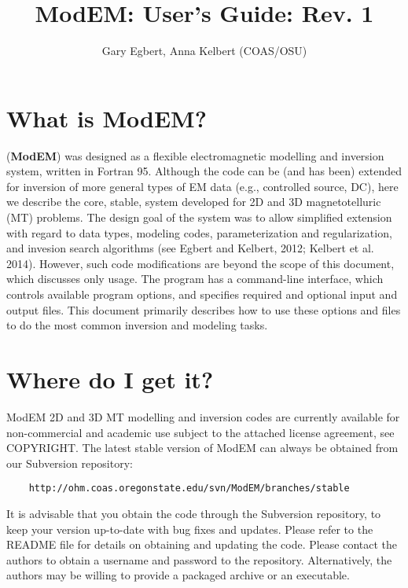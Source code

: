 \documentclass[12pt]{article}
\begin{document}
\title{ModEM: User's Guide: Rev. 1}
\author{Gary Egbert, Anna Kelbert (COAS/OSU)}
\maketitle

\section{What is ModEM?}

(\textbf{ModEM}) was designed as a flexible electromagnetic modelling
and inversion system, written in Fortran 95. Although the code can be (and has been)
extended for inversion of more general types of EM data (e.g., controlled source, DC),
here we describe the core, stable, system developed for 2D and 3D magnetotelluric
(MT) problems. The design goal of the system was to allow
simplified extension with regard to data types, modeling codes, parameterization
and regularization, and invesion search algorithms (see Egbert and Kelbert, 2012;
Kelbert et al. 2014).  However, such code modifications are beyond the scope of this
document, which discusses only usage.
The program has a command-line interface, which controls available program options,
and specifies required and optional input and output files.
This document primarily describes how to use these options and files to do the
most common inversion and modeling tasks.

\section{Where do I get it?}

ModEM 2D and 3D MT modelling and inversion codes are currently available for non-commercial and academic use subject to the attached license agreement, see COPYRIGHT. The latest stable version of ModEM can always be obtained from our Subversion repository:
\begin{verbatim}
    http://ohm.coas.oregonstate.edu/svn/ModEM/branches/stable
\end{verbatim}

It is advisable that you obtain the code through the Subversion repository, to keep your version up-to-date with bug fixes and updates. Please refer to the README file for details on obtaining and updating the code. Please contact the authors to obtain a username and password to the repository. Alternatively, the authors may be willing to provide a packaged archive or an executable.
\end{document}
